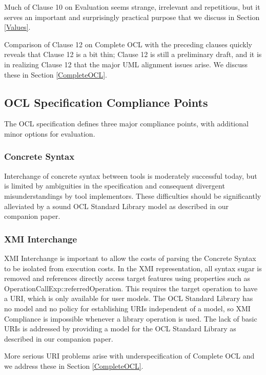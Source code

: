 \documentclass{eceasst}
\begin{document}
Much of Clause 10 on Evaluation seems strange, irrelevant and repetitious, but it serves an important and surprisingly practical purpose that we discuss in Section \ref{Values}.

Comparison of Clause 12 on Complete OCL with the preceding clauses quickly reveals that Clause 12 is a bit thin; Clause 12 is still a preliminary draft, and it is in realizing Clause 12 that the major UML alignment issues arise. We discuss these in Section \ref{CompleteOCL}.
 
\subsection{OCL Specification Compliance Points}

The OCL specification defines three major compliance points, with additional minor options for evaluation.

\subsubsection{Concrete Syntax}

Interchange of concrete syntax between tools is moderately successful today, but is limited by ambiguities in the specification and consequent divergent misunderstandings by tool implementors. These difficulties should be significantly alleviated by a sound OCL Standard Library model as described in our companion paper\cite{OCL-stdlib}.
 
\subsubsection{XMI Interchange}

XMI Interchange is important to allow the costs of parsing the Concrete Syntax to be isolated from execution costs. In the XMI representation, all syntax sugar is removed and references directly access target features using properties such as OperationCallExp::referredOperation. This requires the target operation to have a URI, which is only available for user models. The OCL Standard Library has no model and no policy for establishing URIs independent of a model, so XMI Compliance is impossible whenever a library operation is used. The lack of basic URIs is addressed by providing a model for the OCL Standard Library as described in our companion paper\cite{OCL-stdlib}.

More serious URI problems arise with underspecification of Complete OCL and we address these in Section \ref{CompleteOCL}.
\end{document}

